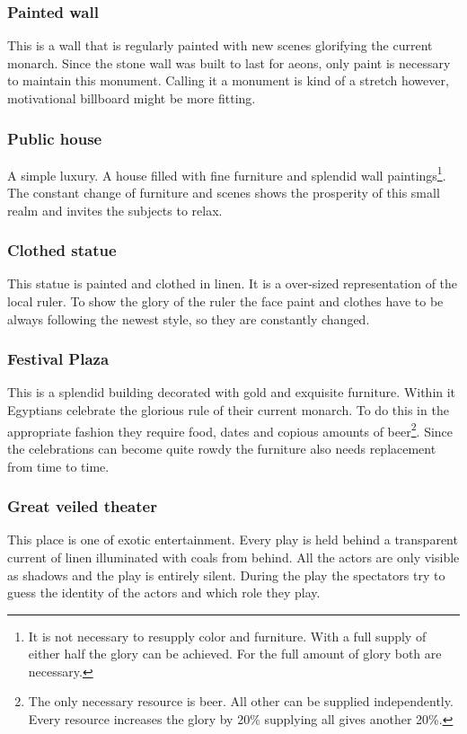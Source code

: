 \documentclass[a4paper]{book}
\begin{document}
		\subsubsection{Painted wall}
			This is a wall that is regularly painted with new scenes glorifying the current monarch.
			Since the stone wall was built to last for aeons,
			only paint is necessary to maintain this monument.
			Calling it a monument is kind of a stretch however,
			motivational billboard might be more fitting.

		\subsubsection{Public house}
			A simple luxury. A house filled with fine furniture and splendid wall paintings\footnote{
				It is not necessary to resupply color and furniture.
				With a full supply of either half the glory can be achieved.
				For the full amount of glory both are necessary.
			}.
			The constant change of furniture and scenes shows the prosperity of this small realm
			and invites the subjects to relax.

		\subsubsection{Clothed statue}
			This statue is painted and clothed in linen.
			It is a over-sized representation of the local ruler.
			To show the glory of the ruler the face paint and clothes
			have to be always following the newest style,
			so they are constantly changed.

		\subsubsection{Festival Plaza}
			This is a splendid building decorated with gold and exquisite furniture.
			Within it \gls{Egyptians} celebrate the glorious rule of their current monarch.
			To do this in the appropriate fashion they require food, dates and copious amounts of beer\footnote{
				The only necessary resource is beer. All other can be supplied independently.
				Every resource increases the glory by 20\% supplying all gives another 20\%.
			}.
			Since the celebrations can become quite rowdy the furniture also needs replacement from time
			to time.

		\subsubsection{Great veiled theater}
			This place is one of exotic entertainment.
			Every play is held behind a transparent current of linen illuminated with coals from behind.
			All the actors are only visible as shadows and the play is entirely silent.
			During the play the spectators try to guess the identity of the actors
			and which role they play.
\end{document}
